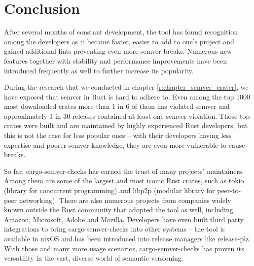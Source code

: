 \documentclass[licencjacka,en]{pracamgr}
\begin{document}
\chapter{Conclusion}\label{r:chapter_conclusion}

After several months of constant development, the tool has found recognition among the developers
as it became faster, easier to add to one's project and gained additional lints preventing
even more semver breaks. Numerous new features together with stability and performance improvements
have been introduced frequently as well to further increase its popularity.

During the research that we conducted in chapter \ref{r:chapter_semver_crater},
we have exposed that semver in Rust is hard to adhere to. Even among the top 1000 most downloaded
crates more than 1 in 6 of them has violated semver and approximately 1 in 30 releases contained at
least one semver violation. Those top crates were built and are maintained by highly experienced
Rust developers, but this is not the case for less popular ones -- with their developers having
less expertise and poorer semver knowledge, they are even more vulnerable to cause breaks.

So far, cargo-semver-checks has earned the trust of many projects' maintainers. Among them are some
of the largest and most iconic Rust crates, such as tokio (library for concurrent programming)
and libp2p (modular library for peer-to-peer networking). There are also numerous projects from
companies widely known outside the Rust community that adopted the tool as well, including Amazon,
Microsoft, Adobe and Mozilla. Developers have even built third party integrations to bring
cargo-semver-checks into other systems -- the tool is available in nixOS and has been introduced
into release managers like release-plz. With those and many more usage scenarios,
cargo-semver-checks has proven its versatility in the vast, diverse world of semantic versioning.
\end{document}
